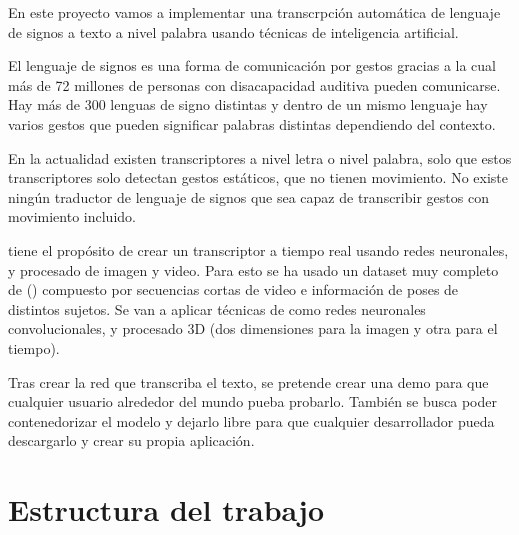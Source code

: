 
En este proyecto vamos a implementar una transcrpción automática de lenguaje de signos a texto a nivel palabra usando técnicas de inteligencia artificial.

El lenguaje de signos es una forma de comunicación por gestos gracias a la cual más de 72 millones de personas con disacapacidad auditiva pueden comunicarse. Hay más de 300 lenguas de signo distintas y dentro de un mismo lenguaje hay varios gestos que pueden significar palabras distintas dependiendo del contexto.

En la actualidad existen transcriptores a nivel letra o nivel palabra, solo que estos transcriptores solo detectan gestos estáticos, que no tienen movimiento. No existe ningún traductor de lenguaje de signos que sea capaz de transcribir gestos con movimiento incluido.

 tiene el propósito de crear un transcriptor a tiempo real usando redes neuronales,  y procesado de imagen y video. Para esto se ha usado un dataset muy completo de  ()  compuesto por secuencias cortas de video e información de poses de distintos sujetos. Se van a aplicar técnicas de  como redes neuronales convolucionales,  y procesado 3D (dos dimensiones para la imagen y otra para el tiempo).

Tras crear la red que transcriba el texto, se pretende crear una demo  para que cualquier usuario alrededor del mundo pueba probarlo. También se busca poder contenedorizar el modelo y dejarlo libre para que cualquier desarrollador pueda descargarlo y crear su propia aplicación.


\section{Estructura del trabajo}

